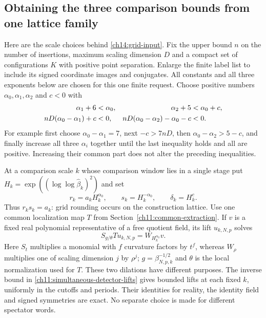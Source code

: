 \subsection{Obtaining the three comparison bounds from one lattice family}
\label{ch14:lattice-comparison}

Here are the scale choices behind \eqref{ch14:grid-input}. Fix the
upper bound $n$ on the number of insertions, maximum scaling dimension $D$ and a compact set of configurations
$K$ with positive point separation. Enlarge the finite label list to
include its signed coordinate images and conjugates. All constants and
all three exponents below are chosen for this one finite request.
Choose positive numbers $\alpha_0,\alpha_1,\alpha_2$ and $c<0$ with
\begin{align}
 \alpha_1+6&<\alpha_0,&\alpha_2+5&<\alpha_0+c,\notag\\
 nD(\alpha_0-\alpha_1)+c&<0,&
 nD(\alpha_0-\alpha_2)-\alpha_0-c&<0.
 \label{ch14:comparison-exponents}
\end{align}
For example first choose $\alpha_0-\alpha_1=7$, next $-c>7nD$,
then $\alpha_0-\alpha_2>5-c$, and finally increase all three
$\alpha_i$ together until the last inequality holds and all are
positive. Increasing their common part does not alter the preceding
inequalities.

At a comparison scale $k$ whose comparison window lies in a single stage put
$H_k=\exp((\log\log\widehat\beta_k)^2)$ and set
\[
 r_k=a_kH_k^{\alpha_0},\qquad s_k=H_k^{-\alpha_0},\qquad
 \delta_k=H_k^c.
\]
Thus $r_ks_k=a_k$: grid rounding occurs on the construction
lattice. Use one common localization map $T$ from
Section~\ref{ch11:common-extraction}. If $v$ is a fixed real polynomial
representative of a free quotient field, its lift $u_{k,N,p}$ solves
\[
                 S_{g/\theta}T u_{k,N,p}=W_{H_k^{\alpha_0}}v.
\]
Here $S_t$ multiplies a monomial with $f$ curvature factors by $t^f$,
whereas $W_\rho$ multiplies one of scaling dimension $j$ by $\rho^j$;
$g=\beta_{N,p,k}^{-1/2}$ and $\theta$ is the local normalization
used for $T$. These two dilations have different purposes.
The inverse bound in \eqref{ch11:simultaneous-detector-lifts} gives
bounded lifts at each fixed $k$, uniformly in the cutoffs and periods.
Their identities for reality, the identity field and signed symmetries are exact. No separate
choice is made for different spectator words.

